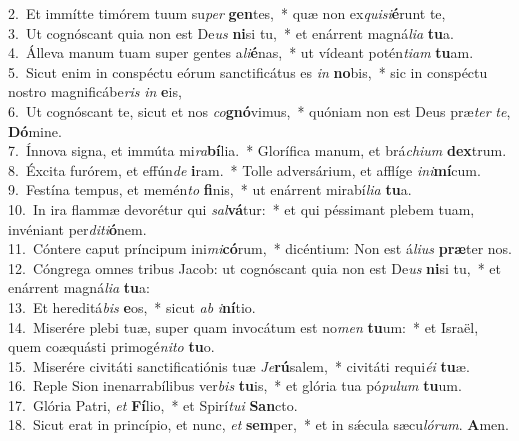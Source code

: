 {2.~}Et immítte timórem tuum su\textit{per} \textbf{gen}tes,~* quæ non ex\textit{qui}\textit{si}\textbf{é}runt te,\\
{3.~}Ut cognóscant quia non est De\textit{us} \textbf{ni}si tu,~* et enárrent magná\textit{li}\textit{a} \textbf{tu}a.\\
{4.~}Álleva manum tuam super gentes a\textit{li}\textbf{é}nas,~* ut vídeant potén\textit{ti}\textit{am} \textbf{tu}am.\\
{5.~}Sicut enim in conspéctu eórum sanctificátus es \textit{in} \textbf{no}bis,~* sic in conspéctu nostro magnificábe\textit{ris} \textit{in} \textbf{e}is,\\
{6.~}Ut cognóscant te, sicut et nos \textit{co}\textbf{gnó}vimus,~* quóniam non est Deus præ\textit{ter} \textit{te}, \textbf{Dó}mine.\\
{7.~}Ínnova signa, et immúta mi\textit{ra}\textbf{bí}lia.~* Glorífica manum, et brá\textit{chi}\textit{um} \textbf{dex}trum.\\
{8.~}Éxcita furórem, et effún\textit{de} \textbf{i}ram.~* Tolle adversárium, et afflíge \textit{i}\textit{ni}\textbf{mí}cum.\\
{9.~}Festína tempus, et memén\textit{to} \textbf{fi}nis,~* ut enárrent mirabí\textit{li}\textit{a} \textbf{tu}a.\\
{10.~}In ira flammæ devorétur qui \textit{sal}\textbf{vá}tur:~* et qui péssimant plebem tuam, invéniant per\textit{di}\textit{ti}\textbf{ó}nem.\\
{11.~}Cóntere caput príncipum ini\textit{mi}\textbf{có}rum,~* dicéntium: Non est á\textit{li}\textit{us} \textbf{præ}ter nos.\\
{12.~}Cóngrega omnes tribus Jacob: ut cognóscant quia non est De\textit{us} \textbf{ni}si tu,~* et enárrent magná\textit{li}\textit{a} \textbf{tu}a:\\
{13.~}Et hereditá\textit{bis} \textbf{e}os,~* sicut \textit{ab} \textit{i}\textbf{ní}tio.\\
{14.~}Miserére plebi tuæ, super quam invocátum est no\textit{men} \textbf{tu}um:~* et Israël, quem coæquásti primogé\textit{ni}\textit{to} \textbf{tu}o.\\
{15.~}Miserére civitáti sanctificatiónis tuæ \textit{Je}\textbf{rú}salem,~* civitáti requi\textit{é}\textit{i} \textbf{tu}æ.\\
{16.~}Reple Sion inenarrabílibus ver\textit{bis} \textbf{tu}is,~* et glória tua pó\textit{pu}\textit{lum} \textbf{tu}um.\\
{17.~}Glória Patri, \textit{et} \textbf{Fí}lio,~* et Spirí\textit{tu}\textit{i} \textbf{San}cto.\\
{18.~}Sicut erat in princípio, et nunc, \textit{et} \textbf{sem}per,~* et in sǽcula sæcu\textit{ló}\textit{rum}. \textbf{A}men.\\
